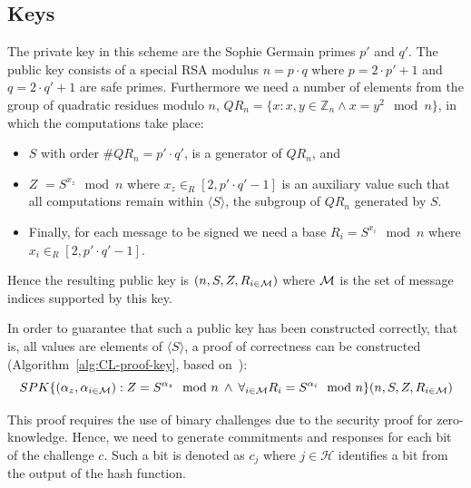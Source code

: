 \subsection{Keys}\label{sec:cl_keys}

The private key in this scheme are the Sophie Germain primes $p'$ and $q'$. The
public key consists of a special RSA modulus $n = p \cdot q$ where
$p = 2 \cdot p' + 1$ and $q = 2 \cdot q' + 1$ are safe primes. Furthermore we
need a number of elements from the group of quadratic residues modulo $n$,
$QR_n = \{ x : x,y \in \mathbb{Z}_n \land x = y^2 \mod n \}$, in which the
computations take place:
\begin{itemize}
  \item $S$ with order $\#QR_n = p' \cdot q'$, is a generator of $QR_n$, and
  \item $Z$ $= S^{x_z} \mod n$ where $x_z \in_R [2, p' \cdot q' - 1]$ is an
    auxiliary value such that all computations remain within
    $\langle S \rangle$, the subgroup of $QR_n$ generated by $S$.
  \item Finally, for each message to be signed we need a base
    $R_i = S^{x_i} \mod n$ where $x_i \in_R [2, p' \cdot q' - 1]$.
\end{itemize}
Hence the resulting public key is $(n, S, Z, R_{i \in \mathcal{M}})$ where
$\mathcal{M}$ is the set of message indices supported by this key.

In order to guarantee that such a public key has been constructed correctly,
that is, all values are elements of $\langle S \rangle$, a proof of
correctness can be constructed (Algorithm~\ref{alg:CL-proof-key}, based
on~\cite[Appendix A]{BrickellCC2004}):
\begin{equation*}
  SPK \{ (\alpha_z, \alpha_{i \in \mathcal{M}}) : Z = S^{\alpha_z} \mod n \:\land\:
    \forall_{i \in \mathcal{M}} R_i = S^{\alpha_i} \mod n \}(n, S, Z, R_{i \in \mathcal{M}})
\end{equation*}

This proof requires the use of binary challenges due to the security proof for
zero-knowledge. Hence, we need to generate commitments and responses for each
bit of the challenge $c$. Such a bit is denoted as $c_j$ where $j \in \mathcal{H}$
identifies a bit from the output of the hash function.
%
%

